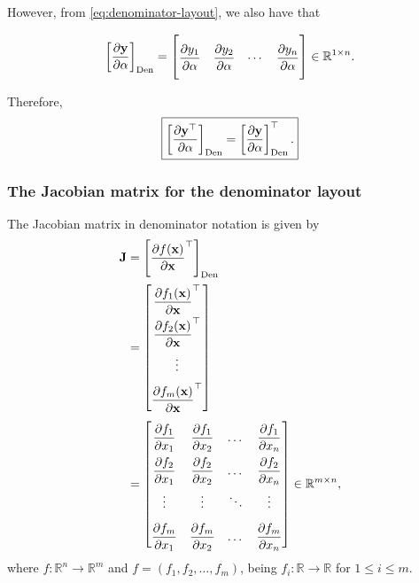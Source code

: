 \documentclass{article}
\begin{document}
However, from \eqref{eq:denominator-layout}, we also have that

\begin{align}
    \left[\dfrac{\partial \mathbf{y}}{\partial \alpha}\right]_{\textnormal{Den}} = \renewcommand{\arraystretch}{2.6}\begin{bmatrix}
        \dfrac{\partial y_{1}}{\partial \alpha} &
        \dfrac{\partial y_{2}}{\partial \alpha} &
        \cdots &
        \dfrac{\partial y_{n}}{\partial \alpha}\vspace{1.3ex}
    \end{bmatrix} \in \mathbb{R}^{1\times n}.
\end{align}

Therefore,
\begin{align}
    \boxed{\left[\dfrac{\partial \mathbf{y}^\top}{\partial \alpha}\right]_{\textnormal{Den}} = \left[\dfrac{\partial \mathbf{y}}{\partial \alpha}\right]_{\textnormal{Den}}^\top.}
\end{align}

\subsubsection{The Jacobian matrix for the denominator layout}
The Jacobian matrix in denominator notation is given by
\begin{align}
    \mathbf{J} & = \left[ \frac{\partial f(\mathbf{x})}{\partial \mathbf{x}}^{\top} \right]_{\textnormal{Den}} \\
    & = \renewcommand{\arraystretch}{2.2}\begin{bmatrix}
        \dfrac{\partial f_1(\mathbf{x})}{\partial \mathbf{x}}^\top \\ \dfrac{\partial f_2(\mathbf{x})}{\partial \mathbf{x}}^\top \\ \vdots \\ \dfrac{\partial f_m(\mathbf{x})}{\partial \mathbf{x}}^\top
    \end{bmatrix} \\
    & = \renewcommand{\arraystretch}{2.2}\begin{bmatrix}
        \dfrac{\partial f_1}{\partial x_1} & \dfrac{\partial f_1}{\partial x_2} & \dots & \dfrac{\partial f_1}{\partial x_n} \\
        \dfrac{\partial f_2}{\partial x_1} & \dfrac{\partial f_2}{\partial x_2} & \dots & \dfrac{\partial f_2}{\partial x_n} \\
        \vdots & \vdots & \ddots & \vdots \\
        \dfrac{\partial f_m}{\partial x_1} & \dfrac{\partial f_m}{\partial x_2} & \dots & \dfrac{\partial f_m}{\partial x_n} \\
    \end{bmatrix} \in \mathbb{R}^{m \times n},
\end{align}
where \(f: \mathbb{R}^{n} \rightarrow \mathbb{R}^{m}\) and \(f = (f_1, f_2, \dots, f_m)\), being \(f_i: \mathbb{R}\rightarrow\mathbb{R}\) for \(1 \leq i \leq m\).
\end{document}
